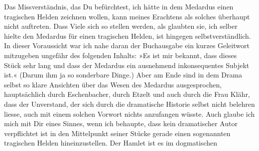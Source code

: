 \pstart
           Das Missverständnis, das Du befürchtest, ich hätte in dem Medardus einen tragischen Helden zeichnen
               wollen, kann meines Erachtens als solches überhaupt nicht auftreten. Dass Viele sich
               so stellen werden, als glaubten sie, ich selber hielte den Medardus für einen tragischen Helden, ist
               hingegen selbstverständlich. In {\pb}dieser Voraussicht war
               ich nahe daran der Buchausgabe ein kurzes Geleitwort mitzugeben ungefähr des
               folgenden Inhalts: \introOben{}»\introOben{}Es ist mir bekannt, dass dieses Stück
               sehr lang und dass der Medardus ein ausnehmend inkonsequentes Subjekt ist.\introOben{}« (\introOben{}Darum \label{T_L01981-1v}\label{T_L01981-1} ihm ja so sonderbare Dinge.\introOben{})\introOben{} Aber am Ende sind in dem Drama selbst so klare Ansichten
               über das Wesen des Medardus
               ausgesprochen, hauptsächlich durch Eschenbacher, durch Etzelt und auch durch die Frau Klähr, dass der Unverstand, der sich durch die dramatische Historie
               selbst nicht belehren liesse, auch mit einem solchen Vorwort nichts anzufangen
               wüsste. Auch glaube ich mich mit Dir eines Sinnes, wenn ich behaupte, dass kein
               dramatischer Autor verpflichtet ist in den Mittelpunkt seiner Stücke gerade einen
                  sogenannt\introOben{}en\introOben{} tragischen Helden hineinzustellen. Der Hamlet ist es im dogmatischen
